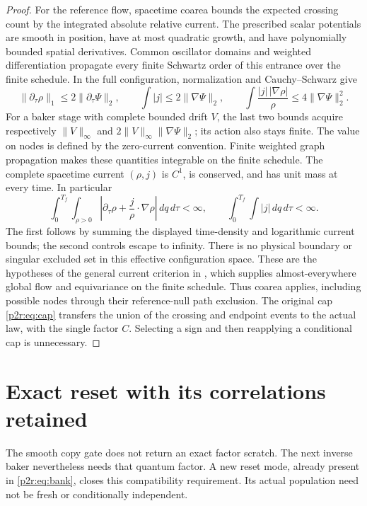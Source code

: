 \documentclass[11pt]{article}
\numberwithin{equation}{section}
\theoremstyle{definition}
\theoremstyle{remark}
\begin{document}
\begin{proof}
For the reference flow, spacetime coarea bounds the expected
crossing count by the integrated absolute relative current.
The prescribed scalar potentials are smooth in position, have at most
quadratic growth, and have polynomially bounded spatial derivatives. Common
oscillator domains and weighted differentiation propagate every
finite Schwartz order of this entrance over the finite schedule.
In the full configuration, normalization and Cauchy--Schwarz give
\[
 \|\partial_\tau\rho\|_1\leq2\|\partial_\tau\Psi\|_2,\qquad
 \int|j|\leq2\|\nabla\Psi\|_2,\qquad
 \int\frac{|j|\,|\nabla\rho|}{\rho}
                       \leq4\|\nabla\Psi\|_2^2 .
\]
For a baker stage with complete bounded drift $V$, the last two
bounds acquire respectively $\|V\|_\infty$ and
$2\|V\|_\infty\|\nabla\Psi\|_2$; its action also stays finite.
The value on nodes is defined by the zero-current convention.
Finite weighted graph propagation makes these quantities integrable
on the finite schedule. The complete spacetime current $(\rho,j)$ is
$C^1$, is conserved, and has unit mass at every time. In particular
\[
 \int_0^{T_f}\!\int_{\rho>0}
 \left|\partial_\tau\rho+\frac{j}{\rho}\cdot\nabla\rho\right|
 \,dq\,d\tau<\infty,
 \qquad
 \int_0^{T_f}\!\int|j|\,dq\,d\tau<\infty.
\]
The first follows by summing the displayed time-density and logarithmic
current bounds; the second controls escape to infinity. There is no
physical boundary or singular excluded set in this effective
configuration space. These are the hypotheses of the general current
criterion in \cite[Theorem~1]{TTflow}, which supplies almost-everywhere
global flow and equivariance on the finite schedule. Thus coarea applies,
including possible nodes through their reference-null path exclusion.
The original cap \eqref{p2r:eq:cap} transfers the union of the
crossing and endpoint events to the actual law, with the single
factor $C$. Selecting a sign and then reapplying a conditional
cap is unnecessary.
\end{proof}

\section{Exact reset with its correlations retained}
\label{p2r:sec:reset}

The smooth copy gate does not return an exact factor scratch.
The next inverse baker nevertheless needs that quantum factor.
A new reset mode, already present in \eqref{p2r:eq:bank}, closes
this compatibility requirement. Its actual population need not
be fresh or conditionally independent.
\end{document}
